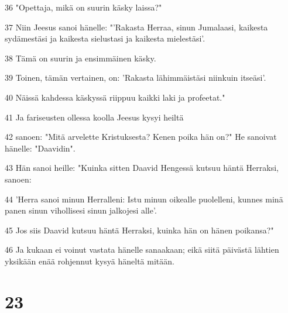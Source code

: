 \par 36 "Opettaja, mikä on suurin käsky laissa?"
\par 37 Niin Jeesus sanoi hänelle: "'Rakasta Herraa, sinun Jumalaasi, kaikesta sydämestäsi ja kaikesta sielustasi ja kaikesta mielestäsi'.
\par 38 Tämä on suurin ja ensimmäinen käsky.
\par 39 Toinen, tämän vertainen, on: 'Rakasta lähimmäistäsi niinkuin itseäsi'.
\par 40 Näissä kahdessa käskyssä riippuu kaikki laki ja profeetat."
\par 41 Ja fariseusten ollessa koolla Jeesus kysyi heiltä
\par 42 sanoen: "Mitä arvelette Kristuksesta? Kenen poika hän on?" He sanoivat hänelle: "Daavidin".
\par 43 Hän sanoi heille: "Kuinka sitten Daavid Hengessä kutsuu häntä Herraksi, sanoen:
\par 44 'Herra sanoi minun Herralleni: Istu minun oikealle puolelleni, kunnes minä panen sinun vihollisesi sinun jalkojesi alle'.
\par 45 Jos siis Daavid kutsuu häntä Herraksi, kuinka hän on hänen poikansa?"
\par 46 Ja kukaan ei voinut vastata hänelle sanaakaan; eikä siitä päivästä lähtien yksikään enää rohjennut kysyä häneltä mitään.

\chapter{23}

